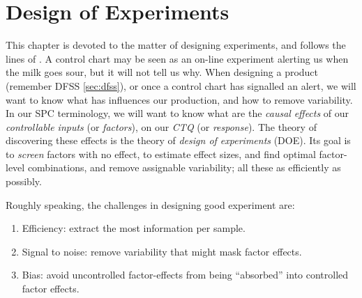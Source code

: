 \chapter{Design of Experiments}

This chapter is devoted to the matter of designing experiments, and follows the lines of \cite{cox_theory_2000}.
A control chart may be seen as an on-line experiment alerting us when the milk goes sour, but it will not tell us why. 
When designing a product (remember DFSS \ref{sec:dfss}), or once a control chart has signalled an alert, we will want to know what has influences our production, and how to remove variability.
In our SPC terminology, we will want to know what are the \emph{causal} \emph{effects} of our \emph{controllable inputs} (or \emph{factors}), on our \emph{CTQ} (or \emph{response}). 
The theory of discovering these effects is the theory of \emph{design of experiments} (DOE).
Its goal is to \emph{screen} factors with no effect, to estimate effect sizes, and find optimal factor-level combinations, and remove assignable variability; all these as efficiently as possibly.



Roughly speaking, the challenges in designing good experiment are:
\begin{enumerate}
\item Efficiency: extract the most information per sample. 
\item Signal to noise: remove variability that might mask factor effects.
\item Bias: avoid uncontrolled factor-effects from being ``absorbed'' into controlled factor effects.
\end{enumerate}





